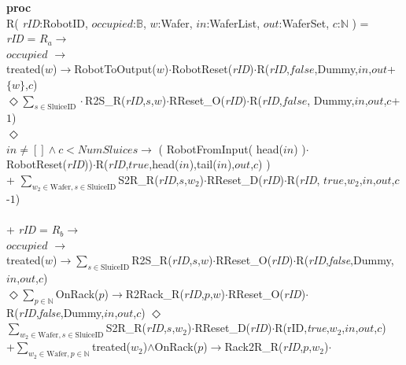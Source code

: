 \documentclass[12pt]{report}
\begin{document}
	{\small
	\textbf{proc}\\
	\phantom{---} R( \emph{rID}:RobotID, $occupied$:$\mathbb{B}$, $w$:Wafer, $in$:WaferList, $out$:WaferSet, $c$:$\mathbb{N}$ ) =\\
	\phantom{-------} \emph{rID} = $R_a \rightarrow$\\
	\phantom{----------} $occupied$ $\rightarrow$\\
	\phantom{--------------} treated($w$)$\rightarrow$RobotToOutput($w$)$\cdot$RobotReset(\emph{rID})$\cdot$R(\emph{rID},$false$,Dummy,$in$,$out$+$\{w\}$,$c$)\\
	\phantom{--------------} $\Diamond \sum\nolimits_{s \in \text{SluiceID}}\cdot$R2S\_R(\emph{rID},$s$,$w$)$\cdot$RReset\_O(\emph{rID})$\cdot$R(\emph{rID},$false$, Dummy,$in$,$out$,$c$+$1$)\\
	\phantom{----------} $\Diamond$\\
	\phantom{--------------} $in \neq [] \land c < NumSluices \rightarrow$ ( RobotFromInput( head($in$) )$\cdot$\\
	\phantom{---------------------} RobotReset(\emph{rID}))$\cdot$R(\emph{rID},$true$,head($in$),tail($in$),$out$,$c$) ) \\
	\phantom{--------------} + $\sum\nolimits_{w_2 \in \text{Wafer}, s \in \text{SluiceID}}$S2R\_R(\emph{rID},$s$,$w_2$)$\cdot$RReset\_D(\emph{rID})$\cdot$R(\emph{rID}, $true$,$w_2$,$in$,$out$,$c$-$1$)\\
	\\
	\phantom{-------} + \emph{rID} = $R_b \rightarrow$\\
	\phantom{----------} $occupied$ $\rightarrow$\\
	\phantom{--------------} treated($w$)$\rightarrow\sum\nolimits_{s\in\text{SluiceID}}$R2S\_R(\emph{rID},$s$,$w$)$\cdot$RReset\_O(\emph{rID})$\cdot$R(\emph{rID},\emph{false},Dummy,$in$,$out$,$c$)\\
	\phantom{--------------} $\Diamond \sum\nolimits_{p\in \mathbb{N}}$OnRack($p$)$\rightarrow$R2Rack\_R(\emph{rID},$p$,$w$)$\cdot$RReset\_O(\emph{rID})$\cdot$R(\emph{rID},\emph{false},Dummy,$in$,$out$,$c$)
	\phantom{----------}  $\Diamond$\\
	\phantom{--------------} $\sum\nolimits_{w_2 \in \text{Wafer}, s \in \text{SluiceID}}$S2R\_R(\emph{rID},$s$,$w_2$)$\cdot$RReset\_D(\emph{rID})$\cdot$R(rID,\emph{true},$w_2$,$in$,$out$,$c$)\\
	\phantom{--------------} +$\sum\nolimits_{w_2 \in \text{Wafer}, p \in \mathbb{N}}$treated($w_2$)$\land$OnRack($p$)$\rightarrow$Rack2R\_R(\emph{rID},$p$,$w_2$)$\cdot$\\
}
\end{document}
